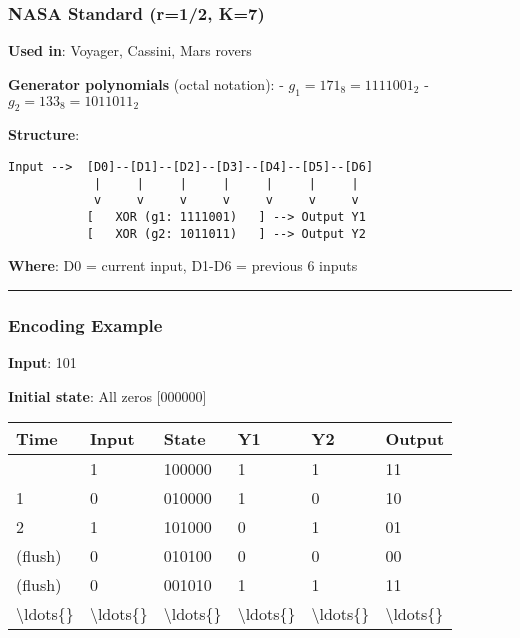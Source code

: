 \subsubsection{NASA Standard (r=1/2, K=7)}\label{nasa-standard-r12-k7}

\textbf{Used in}: Voyager, Cassini, Mars rovers

\textbf{Generator polynomials} (octal notation): -
\(g_1 = 171_8 = 1111001_2\) - \(g_2 = 133_8 = 1011011_2\)

\textbf{Structure}:

\begin{verbatim}
Input -->  [D0]--[D1]--[D2]--[D3]--[D4]--[D5]--[D6]
            |     |     |     |     |     |     |
            v     v     v     v     v     v     v
           [   XOR (g1: 1111001)   ] --> Output Y1
           [   XOR (g2: 1011011)   ] --> Output Y2
\end{verbatim}

\textbf{Where}: D0 = current input, D1-D6 = previous 6 inputs

\begin{center}\rule{0.5\linewidth}{0.5pt}\end{center}

\subsubsection{Encoding Example}\label{encoding-example}

\textbf{Input}: 101

\textbf{Initial state}: All zeros {[}000000{]}

{\def\LTcaptype{} %
\begin{longtable}[]{@{}llllll@{}}
\toprule\noalign{}
Time & Input & State & Y1 & Y2 & Output \\
\midrule\noalign{}
\endhead
\bottomrule\noalign{}
\endlastfoot
0 & 1 & 100000 & 1 & 1 & 11 \\
1 & 0 & 010000 & 1 & 0 & 10 \\
2 & 1 & 101000 & 0 & 1 & 01 \\
(flush) & 0 & 010100 & 0 & 0 & 00 \\
(flush) & 0 & 001010 & 1 & 1 & 11 \\
\textbackslash ldots\{\} & \textbackslash ldots\{\} &
\textbackslash ldots\{\} & \textbackslash ldots\{\} &
\textbackslash ldots\{\} & \textbackslash ldots\{\} \\
\end{longtable}
}

